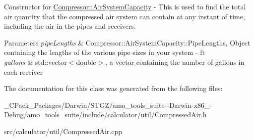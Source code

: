 Constructor for \hyperlink{class_compressor_1_1_air_system_capacity}{Compressor\+::\+Air\+System\+Capacity} -\/ This is used to find the total air quantity that the compressed air system can contain at any instant of time, including the air in the pipes and receivers. 
\begin{DoxyParams}{Parameters}
{\em pipe\+Lengths} & Compressor\+::\+Air\+System\+Capacity\+::\+Pipe\+Lengths, Object containing the lengths of the various pipe sizes in your system -\/ ft \\
\hline
{\em gallons} & std\+::vector$<$double$>$, a vector containing the number of gallons in each receiver \\
\hline
\end{DoxyParams}


The documentation for this class was generated from the following files\+:\begin{DoxyCompactItemize}
\item 
\+\_\+\+C\+Pack\+\_\+\+Packages/\+Darwin/\+S\+T\+G\+Z/amo\+\_\+tools\+\_\+suite-\/-\/\+Darwin-\/x86\+\_-\/\+Debug/amo\+\_\+tools\+\_\+suite/include/calculator/util/Compressed\+Air.\+h\item 
src/calculator/util/Compressed\+Air.\+cpp\end{DoxyCompactItemize}
